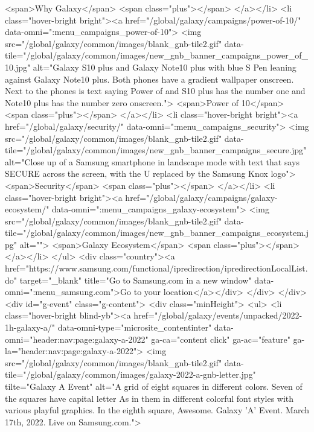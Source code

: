 								<span>Why Galaxy</span>
								<span class="plus"></span>
							</a></li>
							<li class="hover-bright bright"><a href="/global/galaxy/campaigns/power-of-10/" data-omni=":menu_campaigns_power-of-10">
								<img src="/global/galaxy/common/images/blank_gnb-tile2.gif"
									data-tile="/global/galaxy/common/images/new_gnb_banner_campaigns_power_of_10.jpg"
									alt="Galaxy S10 plus and Galaxy Note10 plus with blue S Pen leaning against Galaxy Note10 plus. Both phones have a gradient wallpaper onscreen. Next to the phones is text saying Power of and S10 plus has the number one and Note10 plus has the number zero onscreen.">
								<span>Power of 10</span>
								<span class="plus"></span>
							</a></li>
							<li class="hover-bright bright"><a href="/global/galaxy/security/" data-omni=":menu_campaigns_security">
								<img src="/global/galaxy/common/images/blank_gnb-tile2.gif"
									data-tile="/global/galaxy/common/images/new_gnb_banner_campaigns_secure.jpg"
									alt="Close up of a Samsung smartphone in landscape mode with text that says SECURE across the screen, with the U replaced by the Samsung Knox logo">
								<span>Security</span>
								<span class="plus"></span>
							</a></li>
							<li class="hover-bright bright"><a href="/global/galaxy/campaigns/galaxy-ecosystem/" data-omni=":menu_campaigns_galaxy-ecosystem">
								<img src="/global/galaxy/common/images/blank_gnb-tile2.gif"
									data-tile="/global/galaxy/common/images/new_gnb_banner_campaigns_ecosystem.jpg"
									alt="">
								<span>Galaxy Ecosystem</span>
								<span class="plus"></span>
							</a></li>
						</ul>
						<div class="country"><a href="https://www.samsung.com/functional/ipredirection/ipredirectionLocalList.do" target="_blank" title="Go to Samsung.com in a new window" data-omni=":menu_samsung.com">Go to your location</a></div>
					</div>
				</div>
				<div id="g-event" class="g-content">
					<div class="minHeight">
						<ul>
                            <li class="hover-bright blind-yb"><a href="/global/galaxy/events/unpacked/2022-1h-galaxy-a/" data-omni-type="microsite_contentinter" data-omni="header:nav:page:galaxy-a-2022" ga-ca="content click" ga-ac="feature" ga-la="header:nav:page:galaxy-a-2022">
								<img src="/global/galaxy/common/images/blank_gnb-tile2.gif"
									data-tile="/global/galaxy/common/images/galaxy-2022-a-gnb-letter.jpg"
                                    tilte="Galaxy A Event"
									alt="A grid of eight squares in different colors. Seven of the squares have capital letter As in them in different colorful font styles with various playful graphics. In the eighth square, Awesome. Galaxy 'A' Event. March 17th, 2022. Live on Samsung.com.">
